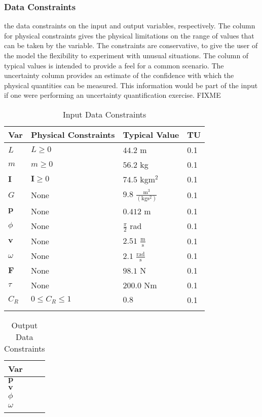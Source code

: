\documentclass[12pt]{article}
\begin{document}
\subsubsection{Data Constraints}
\label{Sec:DataCons}
the data constraints on the input and output variables, respectively. The column for physical constraints gives the physical limitations on the range of values that can be taken by the variable. The constraints are conservative, to give the user of the model the flexibility to experiment with unusual situations. The column of typical values is intended to provide a feel for a common scenario. The uncertainty column provides an estimate of the confidence with which the physical quantities can be measured. This information would be part of the input if one were performing an uncertainty quantification exercise. FIXME
\begin{longtable}{l l l l}
\toprule
Var & Physical Constraints & Typical Value & TU
\\
\midrule
$L$ & $L\geq{}0$ & $44.2$ m & 0.1
\\
$m$ & $m\geq{}0$ & $56.2$ kg & 0.1
\\
$\mathbf{I}$ & $\mathbf{I}\geq{}0$ & $74.5$ kg$\text{m}^{2}$ & 0.1
\\
$G$ & None & $9.8$ $\frac{\text{m}^{3}}{(\text{kg}\text{s}^{2})}$ & 0.1
\\
$\mathbf{p}$ & None & $0.412$ m & 0.1
\\
$\phi{}$ & None & $\frac{\pi{}}{2}$ rad & 0.1
\\
$\mathbf{v}$ & None & $2.51$ $\frac{\text{m}}{\text{s}}$ & 0.1
\\
$\omega{}$ & None & $2.1$ $\frac{\text{rad}}{\text{s}}$ & 0.1
\\
$\mathbf{F}$ & None & $98.1$ N & 0.1
\\
$\tau{}$ & None & $200.0$ Nm & 0.1
\\
${C_{R}}$ & $0\leq{}{C_{R}}\leq{}1$ & $0.8$ & 0.1
\\
\bottomrule
\caption{Input Data Constraints}
\label{Table:InpuDataCons}
\end{longtable}
\begin{longtable}{l}
\toprule
Var
\\
\midrule
$\mathbf{p}$
\\
$\mathbf{v}$
\\
$\phi{}$
\\
$\omega{}$
\\
\bottomrule
\caption{Output Data Constraints}
\label{Table:OutpDataCons}
\end{longtable}
\end{document}
